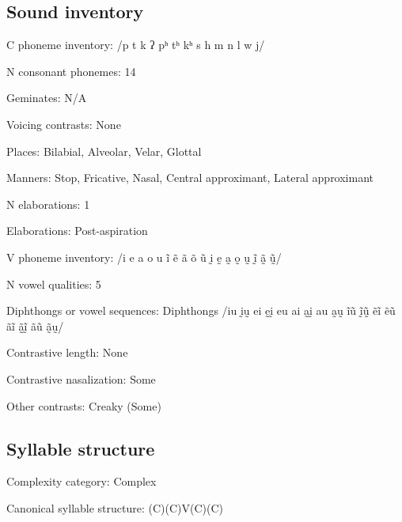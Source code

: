 {\subsection*{Sound inventory}
\begin{appendixdesc}

\item[C phoneme inventory:] /p t k ʔ pʰ tʰ kʰ s h m n l w j/

\item[N consonant phonemes:] 14

\item[Geminates:] N/A

\item[Voicing contrasts:] None

\item[Places:] Bilabial, Alveolar, Velar, Glottal

\item[Manners:] Stop, Fricative, Nasal, Central approximant, Lateral approximant

\item[N elaborations:] 1

\item[Elaborations:] Post-aspiration

\item[V phoneme inventory:] /i e a o u ĩ ẽ ã õ ũ ḭ ḛ a̰ o̰ ṵ ḭ̃ ã̰ ṵ̃/

\item[N vowel qualities:] 5

\item[Diphthongs or vowel sequences:] Diphthongs /iu ḭṵ ei ḛḭ eu ai a̰ḭ au a̰ṵ ĩũ ḭ̃ṵ̃ ẽĩ ẽũ ãĩ ã̰ḭ̃ ãũ ã̰ṵ/

\item[Contrastive length:] None

\item[Contrastive nasalization:] Some

\item[Other contrasts:] Creaky (Some)
\end{appendixdesc}
\subsection*{Syllable structure}
\begin{appendixdesc}

\item[Complexity category:] Complex

\item[Canonical syllable structure:] (C)(C)V(C)(C) \citep[124--134]{Eberhard2009}


\end{appendixdesc}}
